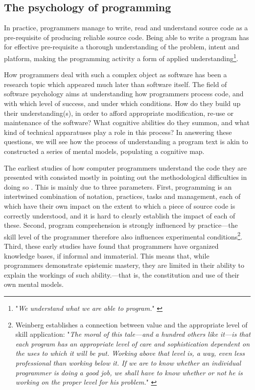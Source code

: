 \subsection{The psychology of programming}
\label{subsec:psychology-programming}

In practice, programmers manage to write, read and understand source code as a pre-requisite of producing reliable source code. Being able to write a program has for effective pre-requisite a thorough understanding of the problem, intent and platform, making the programming activity a form of applied understanding\footnote{"\emph{We understand what we are able to program.}" \citep{ershov_aesthetics_1972}}.

How programmers deal with such a complex object as software has been a research topic which appeared much later than software itself. The field of software psychology aims at understanding how programmers process code, and with which level of success, and under which conditions. How do they build up their understanding(s), in order to afford appropriate modification, re-use or maintenance of the software? What cognitive abilities do they summon, and what kind of technical apparatuses play a role in this process? In answering these questions, we will see how the process of understanding a program text is akin to constructed a series of mental models, populating a cognitive map.

The earliest studies of how computer programmers understand the code they are presented with consisted mostly in pointing out the methodological difficulties in doing so \citep{sheil_psychological_1981,shneiderman_measuring_1977,weinberg_psychology_1998}. This is mainly due to three parameters. First, programming is an intertwined combination of notation, practices, tasks and management, each of which have their own impact on the extent to which a piece of source code is correctly understood, and it is hard to clearly establish the impact of each of these. Second, program comprehension is strongly influenced by practice—the skill level of the programmer therefore also influences experimental conditions\footnote{Weinberg establishes a connection between value and the appropriate level of skill application: "\emph{The moral of this tale—and a hundred others like it—is that each program has an appropriate level of care and sophistication dependent on the uses to which it will be put. Working above that level is, a way, even less professional than working below it. If we are to know whether an individual programmer is doing a good job, we shall have to know whether or not he is working on the proper level for his problem.}" \citep{weinberg_psychology_1998}}. Third, these early studies have found that programmers have organized knowledge bases, if informal and immaterial. This means that, while programmers demonstrate epistemic mastery, they are limited in their ability to explain the workings of such ability.—that is, the constitution and use of their own mental models.

